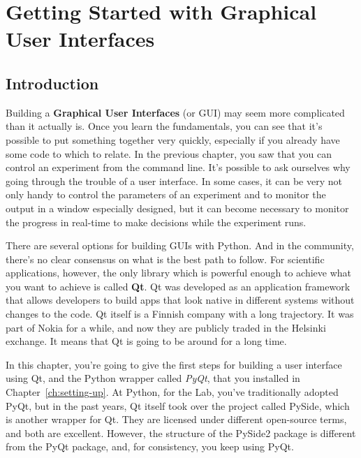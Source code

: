 \chapter[Graphical User Interfaces]{Getting Started with Graphical User Interfaces}\label{ch:starting-gui}

\section{Introduction}\label{sec:gui-introduction}
Building a \textbf{Graphical User Interfaces} (or GUI) may seem more complicated than it actually is. Once you learn the fundamentals, you can see that it's possible to put something together very quickly, especially if you already have some code to which to relate. In the previous chapter, you saw that you can control an experiment from the command line. It's possible to ask ourselves why going through the trouble of a user interface. In some cases, it can be very not only handy to control the parameters of an experiment and to monitor the output in a window especially designed, but it can become necessary to monitor the progress in real-time to make decisions while the experiment runs.

There are several options for building GUIs with Python. And in the community, there's no clear consensus on what is the best path to follow. For scientific applications, however, the only library which is powerful enough to achieve what you want to achieve is called \textbf{Qt}. Qt was developed as an application framework that allows developers to build apps that look native in different systems without changes to the code. Qt itself is a Finnish company with a long trajectory. It was part of Nokia for a while, and now they are publicly traded in the Helsinki exchange. It means that Qt is going to be around for a long time.

In this chapter, you're going to give the first steps for building a user interface using Qt, and the Python wrapper called \emph{PyQt}, that you installed in Chapter~\ref{ch:setting-up}. At Python, for the Lab, you've traditionally adopted PyQt, but in the past years, Qt itself took over the project called PySide, which is another wrapper for Qt. They are licensed under different open-source terms, and both are excellent. However, the structure of the PySide2 package is different from the PyQt package, and, for consistency, you keep using PyQt.



